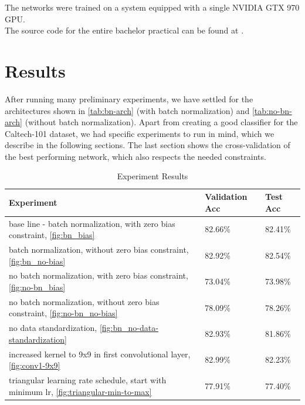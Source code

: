 \documentclass[a4paper, 11pt]{article}
\begin{document}
The networks were trained on a system equipped with a single NVIDIA GTX 970 GPU.\\

The source code for the entire bachelor practical can be found at \cite{UnternaehrerCode}.

\section{Results}
After running many preliminary experiments, we have settled for the architectures shown in \cref{tab:bn-arch} (with batch normalization) and \cref{tab:no-bn-arch} (without batch normalization).
Apart from creating a good classifier for the Caltech-101 dataset, we had specific experiments to run in mind, which we describe in the following sections.
The last section shows the cross-validation of the best performing network, which also respects the needed constraints.

\begin{table}[!h]
	\begin{center}
		\begin{tabularx}{\linewidth}{|X|l|l|}
			\hline \textbf{Experiment} & \textbf{Validation Acc} & \textbf{Test Acc}\\ 
			\hline base line - batch normalization, with zero bias constraint, \cref{fig:bn_bias} & 82.66\% & 82.41\% \\
			\hline batch normalization, without zero bias constraint, \cref{fig:bn_no-bias} & 82.92\% & 82.54\% \\
			\hline no batch normalization, with zero bias constraint, \cref{fig:no-bn_bias} & 73.04\% & 73.98\% \\
			\hline no batch normalization, without zero bias constraint, \cref{fig:no-bn_no-bias} & 78.09\% & 78.26\% \\
			\hline no data standardization, \cref{fig:bn_no-data-standardization} & 82.93\% & 81.86\% \\
			\hline increased kernel to 9x9 in first convolutional layer, \cref{fig:conv1-9x9} & 82.99\% & 82.23\% \\
			\hline triangular learning rate schedule, start with minimum lr, \cref{fig:triangular-min-to-max} & 77.91\% & 77.40\% \\
			\hline
		\end{tabularx}
	\end{center}
	\caption{Experiment Results}
	\label{tab:experiment-results}
\end{table}
\clearpage
\end{document}
